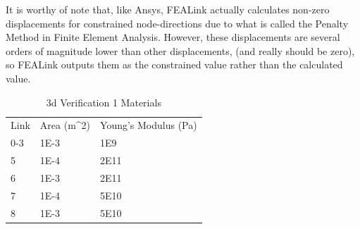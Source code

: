 \documentclass[11pt, oneside]{article}   	%
\begin{document}
It is worthy of note that, like Ansys, FEALink actually calculates non-zero displacements for constrained node-directions due to what is called the Penalty Method in Finite Element Analysis.  However, these displacements are several orders of magnitude lower than other displacements, (and really should be zero), so FEALink outputs them as the constrained value rather than the calculated value.

\begin{table}[h]
\centering
 \caption{3d Verification 1 Materials}
 \label{table:3dV1Material}
 \begin{tabular}{l|l|l}
 Link & Area (m\textasciicircum 2) & Young's Modulus (Pa) \\
 0-3 & 1E-3                       & 1E9                  \\
 5    &  1E-4                       & 2E11                 \\
 6    & 1E-3                       & 2E11                 \\
 7    & 1E-4                       & 5E10                 \\
 8    & 1E-3                       & 5E10       
 \end{tabular}
\end{table}
\end{document}
